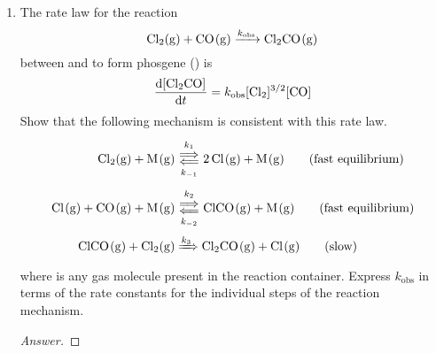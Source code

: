 \documentclass[../psets.tex]{subfiles}
\begin{document}
\begin{enumerate}[label={\textbf{29-\arabic*.}},leftmargin=3.5em]
\begin{proof}[Answer]
\begin{align*}
            0 &= k_2\cnc{NO2}\cnc{NO3}-k_3\cnc{NO3}\cnc{NO}\\
            \cnc{NO} &= \frac{k_2}{k_3}\cnc{NO2}
        \end{align*}
        Hence,
        \begin{align*}
            0 &= k_1\cnc{N2O5}-k_{-1}\cnc{NO2}\cnc{NO3}-k_2\cnc{NO2}\cnc{NO3}-k_3\cnc{NO3}\cnc{NO}\\
            &= k_1\cnc{N2O5}-k_{-1}\cnc{NO2}\cnc{NO3}-k_2\cnc{NO2}\cnc{NO3}-k_2\cnc{NO3}\cnc{NO2}\\
            &= k_1\cnc{N2O5}-(k_{-1}+2k_2)\cnc{NO2}\cnc{NO3}\\
            \cnc{NO2}\cnc{NO3} &= \frac{k_1}{k_{-1}+2k_2}\cnc{N2O5}
        \end{align*}
        Therefore, we have that
        \begin{equation*}
            \boxed{\dv{\cnc{O2}}{t} = \underbrace{\frac{k_1k_2}{k_{-1}+2k_2}}_{k_\text{obs}}\cnc{N2O5}}
        \end{equation*}
    \end{proof}
    \item The rate law for the reaction
    \begin{equation*}
        \ce{Cl2(g) + CO(g) ->[$k_\text{obs}$] Cl2CO(g)}
    \end{equation*}
    between  and  to form phosgene () is
    \begin{equation*}
        \dv{\cnc{Cl2CO}}{t} = k_\text{obs}\cnc{Cl2}^{3/2}\cnc{CO}
    \end{equation*}
    Show that the following mechanism is consistent with this rate law.
    \begin{align*}
        \ce{Cl2(g) + M(g)} &\Longleftrightarrows[k_1][k_{-1}] \ce{2Cl(g) + M(g)}\tag{fast equilibrium}\\
        \ce{Cl(g) + CO(g) + M(g)} &\Longleftrightarrows[k_2][k_{-2}] \ce{ClCO(g) + M(g)}\tag{fast equilibrium}\\
        \ce{ClCO(g) + Cl2(g)} &\xRightarrow{k_3} \ce{Cl2CO(g) + Cl(g)}\tag{slow}
    \end{align*}
    where  is any gas molecule present in the reaction container. Express $k_\text{obs}$ in terms of the rate constants for the individual steps of the reaction mechanism.
    \begin{proof}[Answer]

\end{proof}
\end{enumerate}
\end{document}
